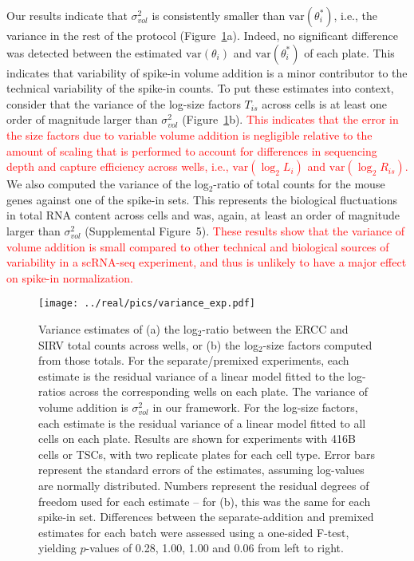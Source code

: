 \documentclass{article}
\newcommand{\suppfigcell}{5}
\newcommand{\revised}[1]{\textcolor{red}{#1}}
\newcommand\variance{\mbox{var}}
\begin{document}
Our results indicate that $\sigma^2_{vol}$ is consistently smaller than $\variance(\theta^*_i)$, i.e., the variance in the rest of the protocol (Figure~\ref{fig:varestimates}a).
Indeed, no significant difference was detected between the estimated $\variance(\theta_i)$ and $\variance(\theta^*_i)$ of each plate.
This indicates that variability of spike-in volume addition is a minor contributor to the technical variability of the spike-in counts.
To put these estimates into context, consider that the variance of the log-size factors $T_{is}$ across cells is at least one order of magnitude larger than $\sigma^2_{vol}$ (Figure~\ref{fig:varestimates}b).
\revised{This indicates that the error in the size factors due to variable volume addition is negligible relative to the amount of scaling that is performed to account for differences in sequencing depth and capture efficiency across wells, i.e., $\variance{(\log_2 L_{i})}$ and $\variance{(\log_2 R_{is})}$.}
We also computed the variance of the log$_2$-ratio of total counts for the mouse genes against one of the spike-in sets.
This represents the biological fluctuations in total RNA content across cells and was, again, at least an order of magnitude larger than $\sigma^2_{vol}$ (Supplemental Figure~\suppfigcell{}).
\revised{These results show that the variance of volume addition is small compared to other technical and biological sources of variability in a scRNA-seq experiment, and thus is unlikely to have a major effect on spike-in normalization.}

\begin{figure}[btp]
    \begin{center}
        \texttt{[image: ../real/pics/variance\_exp.pdf]}
    \end{center}
    \caption{Variance estimates of (a) the log$_2$-ratio between the ERCC and SIRV total counts across wells, or (b) the log$_2$-size factors computed from those totals.
        For the separate/premixed experiments, each estimate is the residual variance of a linear model fitted to the log-ratios across the corresponding wells on each plate.
        The variance of volume addition is $\sigma^2_{vol}$ in our framework.
        For the log-size factors, each estimate is the residual variance of a linear model fitted to all cells on each plate.
        Results are shown for experiments with 416B cells or TSCs, with two replicate plates for each cell type.
        Error bars represent the standard errors of the estimates, assuming log-values are normally distributed.
        Numbers represent the residual degrees of freedom used for each estimate -- for (b), this was the same for each spike-in set.
        Differences between the separate-addition and premixed estimates for each batch were assessed using a one-sided F-test, yielding $p$-values of 0.28, 1.00, 1.00 and 0.06 from left to right.
    }
    \label{fig:varestimates}
\end{figure}
\end{document}
